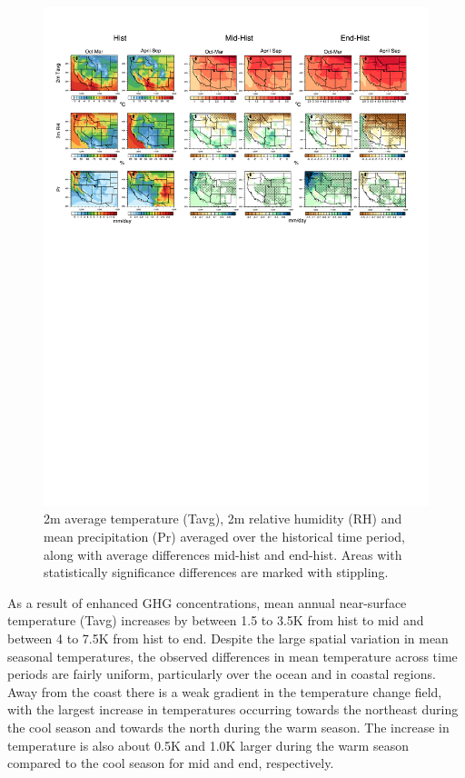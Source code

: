 \begin{figure}
\begin{center}
\includegraphics[width=8in, trim={0.6cm 15.5cm 1.0cm 1.0cm},clip]{pr_mean_clm.pdf}
\caption{2m average temperature (Tavg), 2m relative humidity (RH) and mean precipitation (Pr) averaged over the historical time period, along with average differences \textsf{mid}-\textsf{hist} and \textsf{end}-\textsf{hist}.  Areas with statistically significance differences are marked with stippling.}
\label{fig:meanClm}
\end{center}
\end{figure}

As a result of enhanced GHG concentrations, mean annual near-surface temperature (Tavg) increases by between 1.5 to 3.5K from \textsf{hist} to \textsf{mid} and between 4 to 7.5K from \textsf{hist} to \textsf{end}. Despite the large spatial variation in mean seasonal temperatures, the observed differences in mean temperature across time periods are fairly uniform, particularly over the ocean and in coastal regions.  Away from the coast there is a weak gradient in the temperature change field, with the largest increase in temperatures occurring towards the northeast during the cool season and towards the north during the warm season.  The increase in temperature is also about 0.5K and 1.0K larger during the warm season compared to the cool season for \textsf{mid} and \textsf{end}, respectively.


